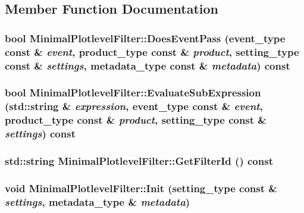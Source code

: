 \subsection{Member Function Documentation}
\hypertarget{classMinimalPlotlevelFilter_af6f815df35d7ee526a860be377834363}{
\subsubsection[{DoesEventPass}]{\setlength{\rightskip}{0pt plus 5cm}bool MinimalPlotlevelFilter::DoesEventPass (event\_\-type const \& {\em event}, \/  product\_\-type const \& {\em product}, \/  setting\_\-type const \& {\em settings}, \/  metadata\_\-type const \& {\em metadata}) const}}
\label{classMinimalPlotlevelFilter_af6f815df35d7ee526a860be377834363}
\hypertarget{classMinimalPlotlevelFilter_afbc57cd2c1cf01f677370e059d37a05b}{
\subsubsection[{EvaluateSubExpression}]{\setlength{\rightskip}{0pt plus 5cm}bool MinimalPlotlevelFilter::EvaluateSubExpression (std::string \& {\em expression}, \/  event\_\-type const \& {\em event}, \/  product\_\-type const \& {\em product}, \/  setting\_\-type const \& {\em settings}) const}}
\label{classMinimalPlotlevelFilter_afbc57cd2c1cf01f677370e059d37a05b}
\hypertarget{classMinimalPlotlevelFilter_a7441333289fdb10e98e4b90bec49fe7c}{
\subsubsection[{GetFilterId}]{\setlength{\rightskip}{0pt plus 5cm}std::string MinimalPlotlevelFilter::GetFilterId () const}}
\label{classMinimalPlotlevelFilter_a7441333289fdb10e98e4b90bec49fe7c}
\hypertarget{classMinimalPlotlevelFilter_aaefe1a2b934ecae86dadad1d99b36e26}{
\subsubsection[{Init}]{\setlength{\rightskip}{0pt plus 5cm}void MinimalPlotlevelFilter::Init (setting\_\-type const \& {\em settings}, \/  metadata\_\-type \& {\em metadata})}}
